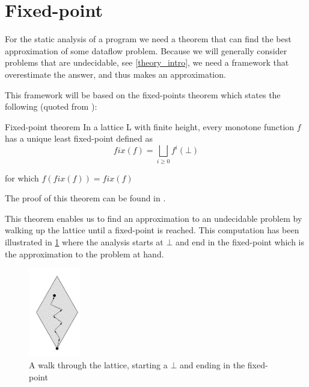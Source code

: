 \section{Fixed-point}
For the static analysis of a program we need a theorem that can find the best approximation of some dataflow problem.
Because we will generally consider problems that are undecidable, see \cref{theory_intro}, we need a framework that overestimate the answer, and thus makes an approximation.

This framework will be based on the fixed-points theorem which states the following (quoted from \citet[p.~13]{schwartzbach}):

\begin{definition}{Fixed-point theorem}
In a lattice L with finite height, every monotone function $f$ has a unique least fixed-point defined as
\[ fix(f) = \bigsqcup_{i \ge 0} f^i(\bot) \]

for which $f(fix(f)) = fix(f)$
\end{definition}

\noindent
The proof of this theorem can be found in \citep[p.~13]{schwartzbach}.

This theorem enables us to find an approximation to an undecidable problem by walking up the lattice until a fixed-point is reached.
This computation has been illustrated in \cref{lattice_walk} where the analysis starts at $\bot$ and end in the fixed-point which is the approximation to the problem at hand.

\begin{figure}
\begin{center}
\includegraphics[width=0.2\textwidth]{figures/fixed-point_walk}
\end{center}
\caption{A walk through the lattice, starting a $\bot$ and ending in the fixed-point}
\label{lattice_walk}
\end{figure}
